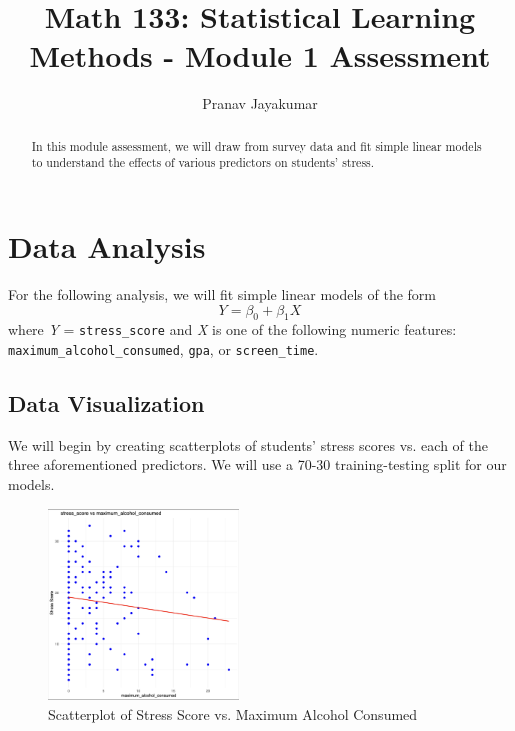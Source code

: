 \documentclass{article}
\title{Math 133: Statistical Learning Methods - Module 1 Assessment}
\author{Pranav Jayakumar}
\theoremstyle{mytheoremstyle}
\theoremstyle{mytheoremstyle}
\theoremstyle{myproblemstyle}
\begin{document}
    \maketitle
    \begin{abstract}
      In this module assessment, we will draw from survey data and fit simple linear models to understand the effects of various
      predictors on students' stress. 
    \end{abstract}
    \vspace{0.25in}
    \section{Data Analysis}
    For the following analysis, we will fit simple linear models of the form 
    \[
      Y = \beta_0 + \beta_1X
    \]
    where \textit{Y} = \verb|stress_score| and \textit{X} is one of the following numeric features: \verb|maximum_alcohol_consumed|, \verb|gpa|, or \verb|screen_time|. 
    \vspace{0.1in}
    \subsection{Data Visualization}
    We will begin by creating scatterplots of students' stress scores vs. each of the three aforementioned predictors.
    We will use a 70-30 training-testing split for our models.
    \vspace{0.1in}
    \begin{figure}[H]
      \begin{center}
        \includegraphics[width=0.45\textwidth]{figures/stress_vs_alcohol.png}
      \end{center}
      \caption{Scatterplot of Stress Score vs. Maximum Alcohol Consumed}\label{fig:}
    \end{figure}
    
\end{document}
